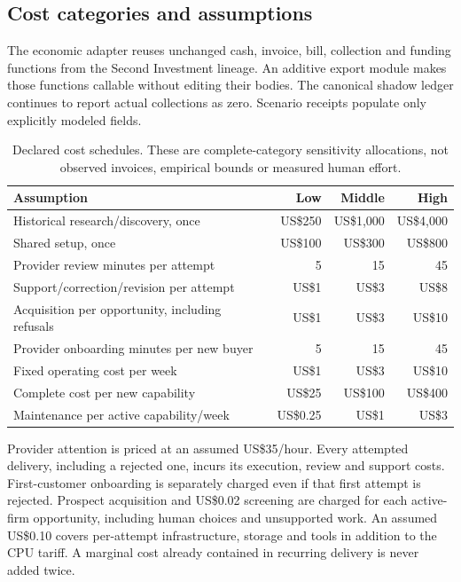 \documentclass[11pt,letterpaper]{article}
\newcommand{\usd}[1]{US\$#1}
\begin{document}
\subsection{Cost categories and assumptions}
The economic adapter reuses unchanged cash, invoice, bill, collection and funding functions from the Second Investment lineage. An additive export module makes those functions callable without editing their bodies. The canonical shadow ledger continues to report actual collections as zero. Scenario receipts populate only explicitly modeled fields.

\begin{table}[htbp]\small
\caption{Declared cost schedules. These are complete-category sensitivity allocations, not observed invoices, empirical bounds or measured human effort.}
\begin{tabularx}{\linewidth}{@{}Yrrr@{}}
\toprule
Assumption & Low & Middle & High \\
\midrule
Historical research/discovery, once & \usd{250} & \usd{1,000} & \usd{4,000} \\
Shared setup, once & \usd{100} & \usd{300} & \usd{800} \\
Provider review minutes per attempt & 5 & 15 & 45 \\
Support/correction/revision per attempt & \usd{1} & \usd{3} & \usd{8} \\
Acquisition per opportunity, including refusals & \usd{1} & \usd{3} & \usd{10} \\
Provider onboarding minutes per new buyer & 5 & 15 & 45 \\
Fixed operating cost per week & \usd{1} & \usd{3} & \usd{10} \\
Complete cost per new capability & \usd{25} & \usd{100} & \usd{400} \\
Maintenance per active capability/week & \usd{0.25} & \usd{1} & \usd{3} \\
\bottomrule
\end{tabularx}
\label{tab:costs}
\end{table}
Provider attention is priced at an assumed \usd{35}/hour. Every attempted delivery, including a rejected one, incurs its execution, review and support costs. First-customer onboarding is separately charged even if that first attempt is rejected. Prospect acquisition and \usd{0.02} screening are charged for each active-firm opportunity, including human choices and unsupported work. An assumed \usd{0.10} covers per-attempt infrastructure, storage and tools in addition to the CPU tariff. A marginal cost already contained in recurring delivery is never added twice.
\end{document}
